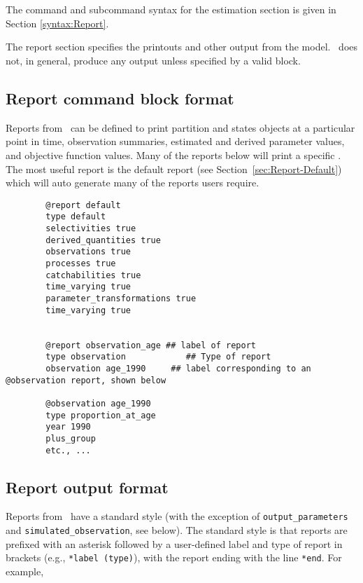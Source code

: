 \section{\label{sec:Report}}

The command and subcommand syntax for the estimation section is given in Section \ref{syntax:Report}.

The report section specifies the printouts and other output from the model. \CNAME\ does not, in general, produce any output unless specified by a valid  block.

\subsection{Report command block format}

Reports from \CNAME\ can be defined to print partition and states objects at a particular point in time, observation summaries, estimated and derived parameter values, and objective function values. Many of the reports below will print a specific \command{}. The most useful report is the default report (see Section~\ref{sec:Report-Default}) which will auto generate many of the reports users require.

\begin{verbatim}
		@report default
		type default
		selectivities true
		derived_quantities true
		observations true
		processes true
		catchabilities true
		time_varying true
		parameter_transformations true
		time_varying true
		
		
		@report observation_age ## label of report
		type observation		    ## Type of report
		observation age_1990	 ## label corresponding to an @observation report, shown below

		@observation age_1990
		type proportion_at_age
		year 1990
		plus_group
		etc., ...
\end{verbatim}



\subsection{Report output format}

Reports from \CNAME\ have a standard style (with the exception of \texttt{output\_parameters} and \texttt{simulated\_observation}, see below). The standard style is that reports are prefixed with an asterisk followed by a user-defined label and type of report in brackets (e.g., \texttt{*label (type)}), with the report ending with the line \texttt{*end}. For example,

